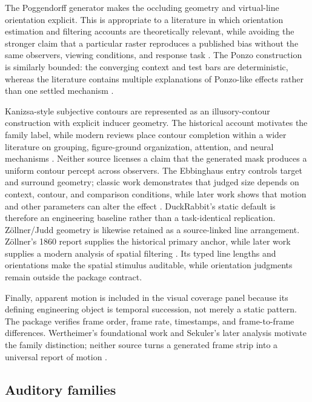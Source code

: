 \documentclass[
  english,
]{article}
\begin{document}
The Poggendorff generator makes the occluding geometry and virtual-line
orientation explicit. This is appropriate to a literature in which
orientation estimation and filtering accounts are theoretically
relevant, while avoiding the stronger claim that a particular raster
reproduces a published bias without the same observers, viewing
conditions, and response task \citep{morgan1999poggendorff}. The Ponzo
construction is similarly bounded: the converging context and test bars
are deterministic, whereas the literature contains multiple explanations
of Ponzo-like effects rather than one settled mechanism
\citep{fisher1967ponzo, yildiz2022ponzo}.

Kanizsa-style subjective contours are represented as an illusory-contour
construction with explicit inducer geometry. The historical account
motivates the family label, while modern reviews place contour
completion within a wider literature on grouping, figure-ground
organization, attention, and neural mechanisms
\citep{kanizsa1976contours, wagemans2012gestalt}. Neither source
licenses a claim that the generated mask produces a uniform contour
percept across observers. The Ebbinghaus entry controls target and
surround geometry; classic work demonstrates that judged size depends on
context, contour, and comparison conditions, while later work shows that
motion and other parameters can alter the effect
\citep{weintraub1979ebbinghaus, mruczek2015ebbinghaus}. DuckRabbit's
static default is therefore an engineering baseline rather than a
task-identical replication. Zöllner/Judd geometry is likewise retained
as a source-linked line arrangement. Zöllner's 1860 report supplies the
historical primary anchor, while later work supplies a modern analysis
of spatial filtering \citep{zoellner1860pseudoscopy, earle1995zollner}.
Its typed line lengths and orientations make the spatial stimulus
auditable, while orientation judgments remain outside the package
contract.

Finally, apparent motion is included in the visual coverage panel
because its defining engineering object is temporal succession, not
merely a static pattern. The package verifies frame order, frame rate,
timestamps, and frame-to-frame differences. Wertheimer's foundational
work and Sekuler's later analysis motivate the family distinction;
neither source turns a generated frame strip into a universal report of
motion \citep{wertheimer1912motion, sekuler1996wertheimer}.

\subsection{Auditory families}\label{auditory-families}
\end{document}
